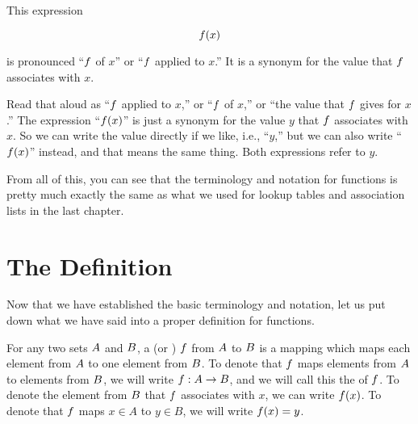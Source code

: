 \documentclass[../../../main.tex]{subfiles}
\begin{document}
\begin{aside}
  \begin{notation}
    This expression
    
    \begin{equation*}
      f(x)
    \end{equation*}
    
    is pronounced ``$f$ of $x$'' or ``$f$ applied to $x$.'' It is a synonym for the value that $f$ associates with $x$.
  \end{notation}
\end{aside}

Read that aloud as ``$f$ applied to $x$,'' or ``$f$ of $x$,'' or ``the value that $f$ gives for $x$.'' The expression ``$f(x)$'' is just a synonym for the value $y$ that $f$ associates with $x$. So we can write the value directly if we like, i.e., ``$y$,'' but we can also write ``$f(x)$'' instead, and that means the same thing. Both expressions refer to $y$.

From all of this, you can see that the terminology and notation for functions is pretty much exactly the same as what we used for lookup tables and association lists in the last chapter.


\section{The Definition}

Now that we have established the basic terminology and notation, let us put down what we have said into a proper definition for functions.

\begin{fdefinition}[Functions]
  \label{def:function}
  For any two sets $A$ and $B$, a  (or ) $f$ from $A$ to $B$ is a mapping which maps each element from $A$ to one element from $B$. To denote that $f$ maps elements from $A$ to elements from $B$, we will write $f : A \rightarrow B$, and we will call this the  of $f$. To denote the element from $B$ that $f$ associates with $x$, we can write $f(x)$. To denote that $f$ maps $x \in A$ to $y \in B$, we will write $f(x) = y$.
\end{fdefinition}
\end{document}
